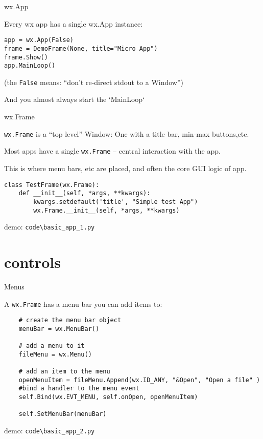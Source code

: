 \documentclass{beamer}
\begin{document}
\begin{frame}[fragile]{wx.App}

\vfill
{\Large Every wx app has a single wx.App instance:}

\begin{verbatim}
app = wx.App(False)
frame = DemoFrame(None, title="Micro App")
frame.Show()
app.MainLoop()
\end{verbatim}

(the \verb`False` means: ``don't re-direct stdout to a Window'')

And you almost always start the `MainLoop`

\end{frame}

\begin{frame}[fragile]{wx.Frame}

\vfill
{\Large \verb`wx.Frame` is a ``top level'' Window: One with a title bar, min-max buttons,etc.}

\vfill
{\Large Most apps have a single \verb`wx.Frame` -- central interaction with the app.} 

\vfill
{\Large This is where menu bars, etc are placed, and often the core GUI logic of app.} 


\begin{verbatim}
class TestFrame(wx.Frame):
    def __init__(self, *args, **kwargs):
        kwargs.setdefault('title', "Simple test App")
        wx.Frame.__init__(self, *args, **kwargs)
\end{verbatim}


\vfill
demo: \verb`code\basic_app_1.py`

\end{frame}

\section{controls}

\begin{frame}[fragile]{Menus}

\vfill
{\Large A \verb`wx.Frame` has a menu bar you can add items to:}

\begin{verbatim}
    # create the menu bar object
    menuBar = wx.MenuBar()
        
    # add a menu to it
    fileMenu = wx.Menu()

    # add an item to the menu
    openMenuItem = fileMenu.Append(wx.ID_ANY, "&Open", "Open a file" )
    #bind a handler to the menu event
    self.Bind(wx.EVT_MENU, self.onOpen, openMenuItem)

    self.SetMenuBar(menuBar)
\end{verbatim}
        
\vfill
demo: \verb`code\basic_app_2.py`

\end{frame}
\end{document}
